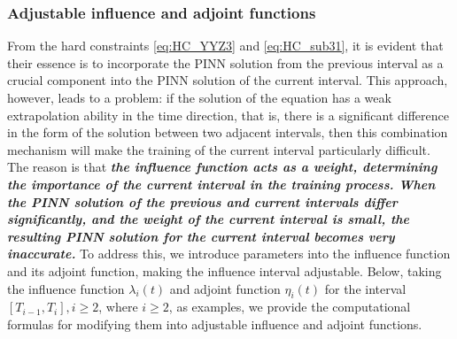 \documentclass[preprint]{elsarticle}
\numberwithin{table}{section}
\numberwithin{equation}{section}
\numberwithin{figure}{section}
\begin{document}
\begin{CJK}{UTF8}{gbsn}
\subsubsection{Adjustable influence  and adjoint  functions}
  

From the hard constraints   \eqref{eq:HC_YYZ3} and \eqref{eq:HC_sub31}, it is evident that their essence is to incorporate the PINN solution from the previous interval as a crucial component into the PINN solution of the current interval. This approach, however, leads to a problem: if the solution of the equation has a weak extrapolation ability in the time direction, 
that is, there is a significant difference in the form of the solution between two adjacent intervals, then this combination mechanism will make the training of the current interval particularly difficult. 
The reason is that \textbf{\textit{the influence function acts as a weight, determining the importance of the current interval in the training process. When the PINN solution of the previous and current intervals differ significantly, and the weight of the current interval is small, the resulting PINN solution for the current interval becomes very inaccurate.}}
To address this, we introduce parameters into the influence function and its adjoint function, making the influence interval adjustable. Below, taking the influence function $\lambda_{i}(t)$ and adjoint function $\eta_{i}(t)$ for the interval $[T_{i-1}, T_{i}],i\ge2$, where $i\geq 2$, as examples, we provide the computational formulas for modifying them into adjustable influence and adjoint functions. 



\end{CJK}
\end{document}
